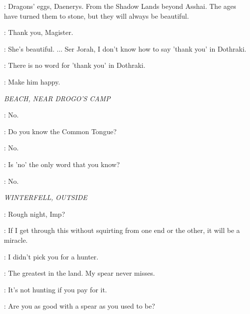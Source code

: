
\ILLYRIO: Dragons' eggs, Daenerys. From the Shadow Lands beyond Asshai. The ages have turned them to stone, but they will always be beautiful. 

\DAENERYS: Thank you, Magister. 


\DAENERYS: She's beautiful. $\ldots$ Ser Jorah, I don't know how to say 'thank you' in Dothraki. 

\JORAH: There is no word for 'thank you' in Dothraki. 


\VISERYS: Make him happy. 


\scene

\textit{BEACH, NEAR DROGO'S CAMP} 


\DROGO: No. 

\DAENERYS: Do you know the Common Tongue? 

\DROGO: No. 

\DAENERYS: Is 'no' the only word that you know? 

\DROGO: No. 



\scene

\textit{WINTERFELL, OUTSIDE} 


\HOUND: Rough night, Imp? 

\TYRION: If I get through this without squirting from one end or the other, it will be a miracle. 

\HOUND: I didn't pick you for a hunter. 

\TYRION: The greatest in the land. My spear never misses. 

\HOUND: It's not hunting if you pay for it. 


\ROBERT: Are you as good with a spear as you used to be? 

